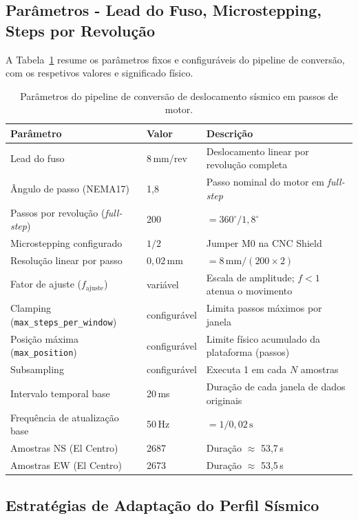 \subsection{Parâmetros - Lead do Fuso, Microstepping, Steps por Revolução}
\label{subsec:parametros-conversao}

A Tabela~\ref{tab:parametros-conversao} resume os parâmetros fixos e configuráveis do pipeline de conversão, com os respetivos valores e significado físico.

\begin{table}[h]
\centering
\caption{Parâmetros do pipeline de conversão de deslocamento sísmico em passos de motor.}
\label{tab:parametros-conversao}
\begin{tabular}{lll}
\hline
\textbf{Parâmetro} & \textbf{Valor} & \textbf{Descrição} \\
\hline
Lead do fuso & 8\,mm/rev & Deslocamento linear por revolução completa \\
Ângulo de passo (NEMA17) & 1{,}8\textdegree{} & Passo nominal do motor em \textit{full-step} \\
Passos por revolução (\textit{full-step}) & 200 & $= 360^\circ / 1{,}8^\circ$ \\
Microstepping configurado & $1/2$ & Jumper M0 na CNC Shield \\
Resolução linear por passo & $0{,}02$\,mm & $= 8\,\text{mm} / (200 \times 2)$ \\
Fator de ajuste ($f_{\text{ajuste}}$) & variável & Escala de amplitude; $f < 1$ atenua o movimento \\
Clamping (\texttt{max\_steps\_per\_window}) & configurável & Limita passos máximos por janela \\
Posição máxima (\texttt{max\_position}) & configurável & Limite físico acumulado da plataforma (passos) \\
Subsampling & configurável & Executa 1 em cada $N$ amostras \\
Intervalo temporal base & 20\,ms & Duração de cada janela de dados originais \\
Frequência de atualização base & 50\,Hz & $= 1 / 0{,}02\,\text{s}$ \\
Amostras NS (El Centro) & 2687 & Duração $\approx$ 53,7\,s \\
Amostras EW (El Centro) & 2673 & Duração $\approx$ 53,5\,s \\
\hline
\end{tabular}
\end{table}


\subsection{Estratégias de Adaptação do Perfil Sísmico}
\label{subsec:estrategias-adaptacao}

